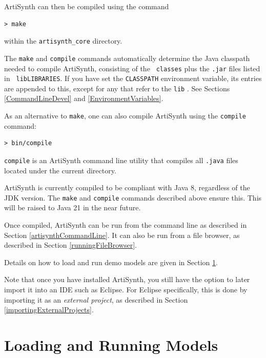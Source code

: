 ArtiSynth can then be compiled using the command
%
\begin{lstlisting}[]
 > make
\end{lstlisting}
%
within the {\tt artisynth\_core} directory. 

\begin{sideblock}
The {\tt make} and {\tt compile} commands automatically determine the
Java classpath needed to compile ArtiSynth, consisting of the {\tt
classes} \directory{} plus the {\tt .jar} files listed in {\tt
lib\SEP LIBRARIES}. If you have set the {\tt CLASSPATH} environment
variable, its entries are appended to this, except for any that refer
to the {\tt lib} \directory{}. See Sections \ref{CommandLineDevel}
and \ref{EnvironmentVariables}.
\end{sideblock}

As an alternative to {\tt make}, one can also compile ArtiSynth using the
{\tt compile} command:
%
\begin{lstlisting}[]
 > bin/compile
\end{lstlisting}
%
{\tt compile} is an ArtiSynth command line utility that compiles all
{\tt .java} files located under the current directory.
\fi %

\begin{sideblock}
ArtiSynth is currently compiled to be compliant with Java 8, regardless
of the JDK version. The {\tt make} and {\tt compile} commands described
above ensure this. This will be raised to Java 21 in the near future.
\end{sideblock}

Once compiled, ArtiSynth can be run from the command line as described
in Section \ref{artisynthCommandLine}.
\ifMacOS
It can also be run from a file browser, as described
in Section \ref{runningFileBrowser}.
\fi
%
\fi %

Details on how to load and run demo models are given in
Section \ref{Running}.

Note that once you have installed ArtiSynth, you still have the option
to later import it into an IDE such as Eclipse. For Eclipse
specifically, this is done by importing it as an {\it external
project}, as described in Section \ref{importingExternalProjects}.

\section{Loading and Running Models}
\label{Running}

\ifMacOS
